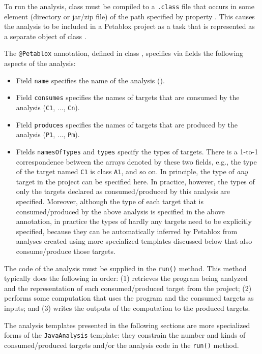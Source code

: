 To run the analysis, class  must be compiled to a
{\tt .class} file that occurs in some element (directory or jar/zip file) of
the path specified by property .  This causes
the analysis to be included in a Petablox project as a task that is represented
as a separate object of class .

The {\tt @Petablox} annotation, defined in class
, specifies via fields
the following aspects of the analysis:
\begin{itemize}
\item
Field {\tt name} specifies the name of the analysis ().
\item
Field {\tt consumes} specifies the names of targets that are consumed by the
analysis ({\tt C1}, ..., {\tt Cn}).
\item
Field {\tt produces} specifies the names of targets that are produced by the
analysis ({\tt P1}, ..., {\tt Pm}).
\item
Fields {\tt namesOfTypes} and {\tt types} specify the types of targets.  There
is a 1-to-1 correspondence between the arrays denoted by these two fields,
e.g., the type of the target named {\tt C1} is class {\tt A1}, and so on.  In
principle, the type of {\it any} target in the project can be specified here.
In practice, however, the types of only the targets declared as
consumed/produced by this analysis are specified.  Moreover, although the type
of each target that is consumed/produced by the above analysis is specified in
the above annotation, in practice the types of hardly any targets need to be
explicitly specified, because they can be automatically inferred by Petablox from
analyses created using more specialized templates discussed below that also
consume/produce those targets.
\end{itemize}

The code of the analysis must be supplied in the {\tt run()} method.  This
method typically does the following in order:
(1) retrieves the program being analyzed and the representation of each
consumed/produced target from the project;
(2) performs some computation that uses the program and the consumed targets
as inputs; and
(3) writes the outputs of the computation to the produced targets.

The analysis templates presented in the following sections are more specialized
forms of the {\tt JavaAnalysis} template: they constrain the number and kinds of
consumed/produced targets and/or the analysis code in the {\tt run()} method.

